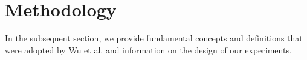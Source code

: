 




\section{Methodology}
In the subsequent section, we provide fundamental concepts and definitions that were adopted by Wu et al. \cite{wu} and information on the design of our experiments.

